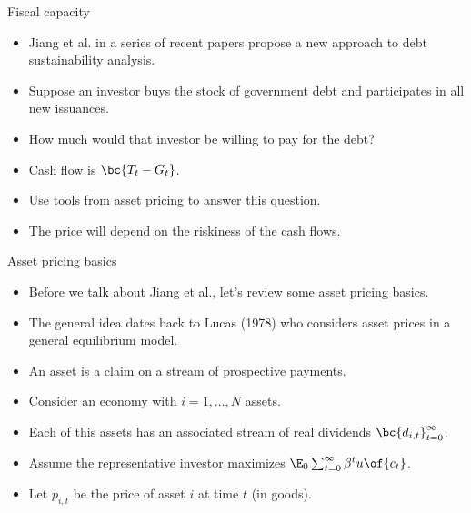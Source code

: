 \documentclass[11pt,xcolor={dvipsnames},aspectratio=159,hyperref={pdftex,pdfpagemode=UseNone,hidelinks,pdfdisplaydoctitle=true},usepdftitle=false]{beamer}
\begin{document}
\begin{frame}{Fiscal capacity}
    \begin{itemize}
        \item Jiang et al. in a series of recent papers propose a new approach to debt sustainability analysis.
        \item Suppose an investor buys the  stock of government debt and participates in all new issuances. 
        \item How much would that investor be willing to pay for the debt?
        \item Cash flow is $\bc{T_t-G_t}$.
        \item Use tools from asset pricing to answer this question.
        \item The price will depend on the riskiness of the cash flows. 
    \end{itemize}
\end{frame}

\begin{frame}{Asset pricing basics}  
    \begin{itemize}
        \item Before we talk about Jiang et al., let's review some asset pricing basics. 
        \item The general idea dates back to Lucas (1978) who considers asset prices in a general equilibrium model.
        \item An asset is a claim on a stream of prospective payments.
        \item Consider an economy with $i=1,\dots,N$ assets.
        \item Each of this assets has an associated stream of real dividends $\bc{d_{i,t}}^\infty_{t=0}$. 
        \item Assume the representative investor maximizes $\E_0 \sum_{t=0}^\infty \beta^t u\of{c_t}$.
        \item Let $p_{i,t}$ be the price of asset $i$ at time $t$ (in goods).
    \end{itemize}
\end{frame}
\end{document}
